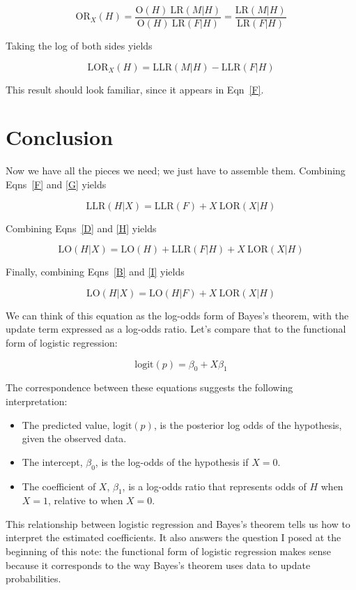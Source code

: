 \documentclass[12pt]{article}
\newcommand{\logit}{\mathrm{logit}}
\renewcommand{\O}{\mathrm{O}}
\newcommand{\LR}{\mathrm{LR}}
\newcommand{\LO}{\mathrm{LO}}
\newcommand{\LLR}{\mathrm{LLR}}
\newcommand{\OR}{\mathrm{OR}}
\newcommand{\LOR}{\mathrm{LOR}}
\begin{document}
\[ \OR_X(H) = \frac{\O(H)~\LR(M|H)}{\O(H)~\LR(F|H)} = 
\frac{\LR(M|H)}{\LR(F|H)}\]

Taking the log of both sides yields

\begin{equation} \label{G}
\LOR_X(H) = \LLR(M|H) - \LLR(F|H)
\end{equation}

This result should look familiar, since it appears in
Eqn~\ref{F}.


\section{Conclusion}

Now we have all the pieces we need; we just have to assemble them.
Combining Eqns~\ref{F} and \ref{G} yields  

\begin{equation} \label{H}
\LLR(H|X) = \LLR(F) + X~\LOR(X|H)
\end{equation}

Combining Eqns~\ref{D} and \ref{H} yields

\begin{equation} \label{I}
\LO(H|X) = \LO(H) + \LLR(F|H) + X~\LOR(X|H)
\end{equation}

Finally, combining Eqns~\ref{B} and \ref{I} yields

\[ \LO(H|X) = \LO(H|F) + X~\LOR(X|H) \]

We can think of this equation as the log-odds form of Bayes's theorem,
with the update term expressed as a log-odds ratio.  Let's compare
that to the functional form of logistic regression:

\[ \logit(p) = \beta_0 + X \beta_1 \]

The correspondence between these equations suggests the following
interpretation:

\begin{itemize}

\item The predicted value, $\logit(p)$, is the posterior log
odds of the hypothesis, given the observed data.

\item The intercept, $\beta_0$, is the log-odds of the
hypothesis if $X=0$.

\item The coefficient of $X$, $\beta_1$, is a log-odds ratio
that represents odds of $H$ when $X=1$, relative to
when $X=0$.

\end{itemize}

This relationship between logistic regression and Bayes's theorem
tells us how to interpret the estimated coefficients.  It also
answers the question I posed at the beginning of this note:
the functional form of logistic regression makes sense because
it corresponds to the way Bayes's theorem uses data to update
probabilities.
\end{document}
